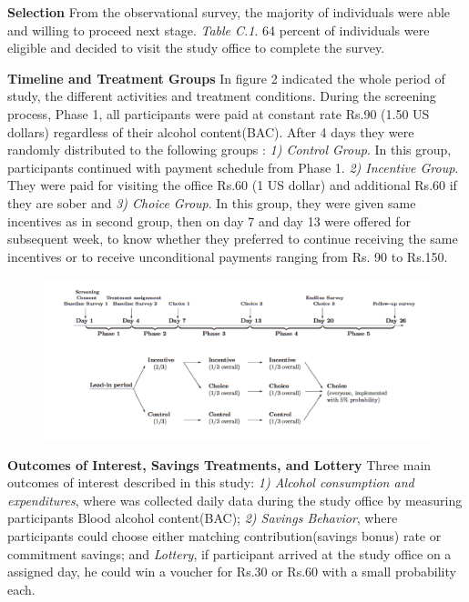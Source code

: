 \documentclass[a4paper,12pt]{article}
\begin{document}
\textbf{Selection}
From the observational survey, the majority of individuals were able and willing to proceed next stage. \textit{Table C.1}. 64 percent of individuals were eligible and decided to visit the study office to complete the survey.


\textbf{Timeline and Treatment Groups}
In figure 2 indicated the whole period of study, the different activities and treatment conditions. During the screening process, Phase 1, all participants were paid at constant rate Rs.90 (1.50 US dollars) regardless of their alcohol content(BAC). After 4 days they were randomly distributed to the following groups : \textit{ 1) Control Group}. In this group, participants continued with payment schedule from Phase 1. \textit{2) Incentive Group}. They were paid for visiting the office Rs.60 (1 US dollar) and additional Rs.60 if they are sober and \textit{3) Choice Group}. In this group, they were given same incentives as in second group, then on day 7 and day 13 were offered for subsequent week, to know whether they preferred to continue receiving the same incentives or to receive unconditional payments ranging from Rs. 90 to Rs.150. 

\begin{figure}[h]
\centering
\includegraphics[width=1\textwidth]{FIG_Experimental_Design.png}
\caption{\label{fig:Figure2}}
\end{figure}

\textbf{Outcomes of Interest, Savings Treatments, and Lottery}
Three main outcomes of interest described in this study: \textit{1) Alcohol consumption and expenditures}, where was collected daily data during the study office by measuring participants Blood alcohol content(BAC); \textit{2) Savings Behavior}, where participants could choose either matching contribution(savings bonus) rate or commitment savings; and \textit{Lottery}, if participant arrived at the study office on a assigned day, he could win a voucher for Rs.30 or Rs.60 with a small probability each.
\end{document}
